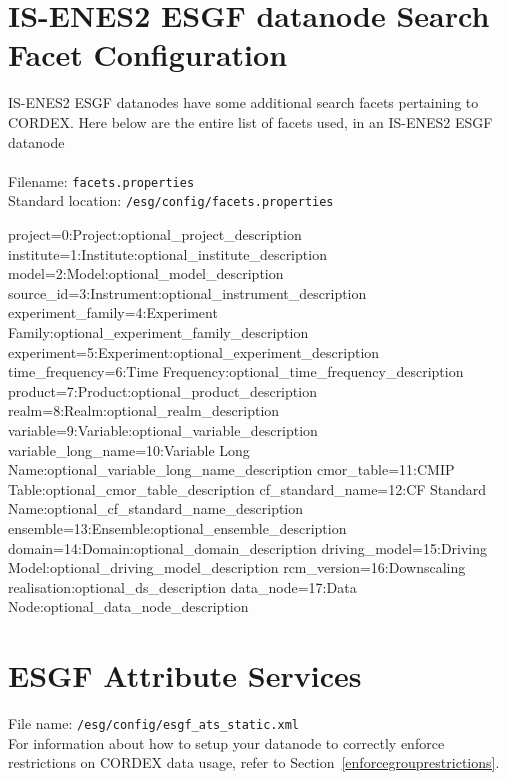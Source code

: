 \section{IS-ENES2 ESGF datanode Search Facet Configuration}
IS-ENES2 ESGF datanodes have some additional search facets pertaining to CORDEX. Here below are the entire list of facets used, in an IS-ENES2 ESGF datanode\\
\vspace{1mm}\\
Filename: \texttt{facets.properties}\\
Standard location: \texttt{/esg/config/facets.properties}
\begin{small}
\begin{verbatimtab}[4]
project=0:Project:optional_project_description
institute=1:Institute:optional_institute_description
model=2:Model:optional_model_description
source_id=3:Instrument:optional_instrument_description
experiment_family=4:Experiment Family:optional_experiment_family_description
experiment=5:Experiment:optional_experiment_description
time_frequency=6:Time Frequency:optional_time_frequency_description
product=7:Product:optional_product_description
realm=8:Realm:optional_realm_description
variable=9:Variable:optional_variable_description
variable_long_name=10:Variable Long Name:optional_variable_long_name_description
cmor_table=11:CMIP Table:optional_cmor_table_description
cf_standard_name=12:CF Standard Name:optional_cf_standard_name_description
ensemble=13:Ensemble:optional_ensemble_description
domain=14:Domain:optional_domain_description
driving_model=15:Driving Model:optional_driving_model_description
rcm_version=16:Downscaling realisation:optional_ds_description
data_node=17:Data Node:optional_data_node_description
\end{verbatimtab}
\end{small}
\section{ESGF Attribute Services}
\label{attribservicesfile}
File name: \texttt{/esg/config/esgf\_ats\_static.xml}\\
For information about how to setup your datanode to correctly enforce restrictions on CORDEX data usage, refer to Section~\ref{enforcegrouprestrictions}.

